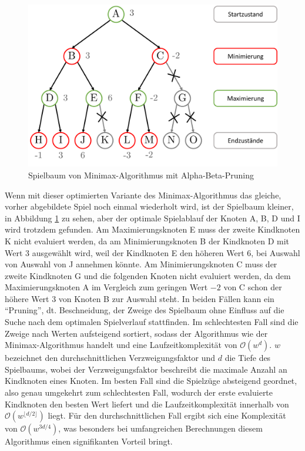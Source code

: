 \begin{figure}[!ht]
    \centering
    \includegraphics[width=\textwidth]{res/pictures/minimax-tree-with-a-b-pruning.pdf}
    \caption{Spielbaum von Minimax-Algorithmus mit Alpha-Beta-Pruning}
    \label{fig:minimax-a-b-tree}
\end{figure}

Wenn mit dieser optimierten Variante des Minimax-Algorithmus das gleiche, vorher abgebildete Spiel noch einmal wiederholt wird, ist der Spielbaum kleiner, in Abbildung \ref{fig:minimax-a-b-tree} zu sehen, aber der optimale Spielablauf der Knoten A, B, D und I wird trotzdem gefunden. Am Maximierungsknoten E muss der zweite Kindknoten K nicht evaluiert werden, da am Minimierungsknoten B der Kindknoten D mit Wert 3 ausgewählt wird, weil der Kindknoten E den höheren Wert 6, bei Auswahl von Auswahl von J annehmen könnte. Am Minimierungsknoten C muss der zweite Kindknoten G und die folgenden Knoten nicht evaluiert werden, da dem Maximierungsknoten A im Vergleich zum geringen Wert $-2$ von C schon der höhere Wert 3 von Knoten B zur Auswahl steht. In beiden Fällen kann ein \enquote{Pruning}, dt. Beschneidung, der Zweige des Spielbaum ohne Einfluss auf die Suche nach dem optimalen Spielverlauf stattfinden. Im schlechtesten Fall sind die Zweige nach Werten aufsteigend sortiert, sodass der Algorithmus wie der Minimax-Algorithmus handelt und eine Laufzeitkomplexität von $\mathcal{O}(w^{d})$. $w$ bezeichnet den durchschnittlichen Verzweigungsfaktor und $d$ die Tiefe des Spielbaums, wobei der Verzweigungsfaktor beschreibt die maximale Anzahl an Kindknoten eines Knoten. Im besten Fall sind die Spielzüge absteigend geordnet, also genau umgekehrt zum schlechtesten Fall, wodurch der erste evaluierte Kindknoten den besten Wert liefert und die Laufzeitkomplexität innerhalb von $\mathcal{O}\left(w^{\lfloor d/2\rfloor}\right)$ liegt. Für den durchschnittlichen Fall ergibt sich eine Komplexität von $\mathcal{O}\left(w^{3d/4}\right)$, was besonders bei umfangreichen Berechnungen diesem Algorithmus einen signifikanten Vorteil bringt. \cite[S. 3 ff.]{2017.AlphaBeta}

